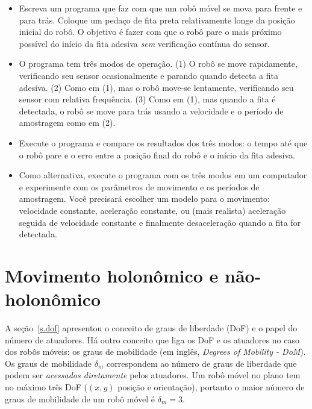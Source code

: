 \begin{framed}
\begin{itemize}
\item Escreva um programa que faz com que um robô móvel se mova para frente e para trás. Coloque um pedaço de fita preta relativamente longe da posição inicial do robô. O objetivo é fazer com que o robô pare o mais próximo possível do início da fita adesiva \emph{sem} verificação contínua do sensor. 
\item O programa tem três modos de operação. (1) O robô se move rapidamente, verificando seu sensor ocasionalmente e parando quando detecta a fita adesiva. (2) Como em (1), mas o robô move-se lentamente, verificando seu sensor com relativa frequência. (3) Como em (1), mas quando a fita é detectada, o robô se move para trás usando a velocidade e o período de amostragem como em (2).
\item Execute o programa e compare os resultados dos três modos: o tempo até que o robô pare e o erro entre a posição final do robô e o início da fita adesiva.
\item Como alternativa, execute o programa com os três modos em um computador e experimente com os parâmetros de movimento e os períodos de amostragem. Você precisará escolher um modelo para o movimento: velocidade constante, aceleração constante, ou (mais realista) aceleração seguida de velocidade constante e finalmente desaceleração quando a fita for detectada.
\end{itemize}
\end{framed}



\section{Movimento holonômico e não-holonômico}\label{s.holonomic}

A seção~\ref{s.dof} apresentou o conceito de graus de liberdade (DoF) e o papel do número de atuadores. Há outro conceito que liga os DoF e os atuadores no caso dos robôs móveis: os graus de mobilidade (em inglês, \emph{Degrees of Mobility - DoM}). Os graus de mobilidade $\delta_m$ correspondem ao número de graus de liberdade que podem ser \emph{acessados diretamente} pelos atuadores. Um robô móvel no plano tem no máximo três DoF ($(x,y)$ posição e orientação), portanto o maior número de graus de mobilidade de um robô móvel é $\delta_m = 3$.

